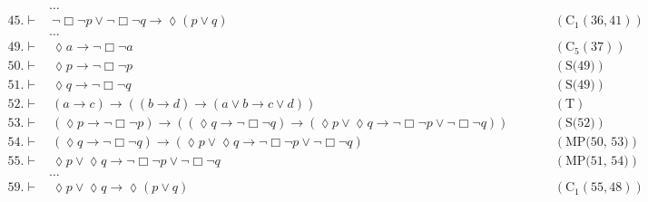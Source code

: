 \documentclass[a4paper, 12pt]{report}
\begin{document}
{{\begin{equation*}
\begin{alignedat}{2}
                               & \ldots && \\
                    45. \vdash & \ \lnot \Box \lnot p \lor \lnot \Box \lnot q \to \lozenge (p\lor q) && \quad \quad (\mbox{C}_1(36, 41)) \\
                               & \ldots && \\
                    49. \vdash & \ \lozenge a \to \lnot \Box \lnot a && \quad \quad (\mbox{C}_5(37)) \\
                    50. \vdash & \ \lozenge p \to \lnot \Box \lnot p && \quad \quad (\mbox{S(49)}) \\
                    51. \vdash & \ \lozenge q \to \lnot \Box \lnot q && \quad \quad (\mbox{S(49)}) \\
                    52. \vdash & \ (a \to c) \to ((b \to d) \to (a \lor b \to c \lor d)) && \quad \quad (\mbox{T}) \\
                    53. \vdash & \ (\lozenge p \to \lnot \Box \lnot p) \to ((\lozenge q \to \lnot \Box \lnot q) \to (\lozenge p \lor \lozenge q \to \lnot \Box \lnot p \lor \lnot \Box \lnot q)) && \quad \quad (\mbox{S(52)}) \\
                    54. \vdash & \ (\lozenge q \to \lnot \Box \lnot q) \to (\lozenge p \lor \lozenge q \to \lnot \Box \lnot p \lor \lnot \Box \lnot q) && \quad \quad (\mbox{MP(50, 53)}) \\
                    55. \vdash & \ \lozenge p \lor \lozenge q \to \lnot \Box \lnot p \lor \lnot \Box \lnot q && \quad \quad (\mbox{MP(51, 54)}) \\
                               & \ldots && \\
                    59. \vdash & \ \lozenge p \lor \lozenge q \to \lozenge (p \lor q) \ && \quad \quad (\mbox{C}_1(55, 48))
                \end{alignedat}
            \end{equation*}
        }

        }
\end{document}
